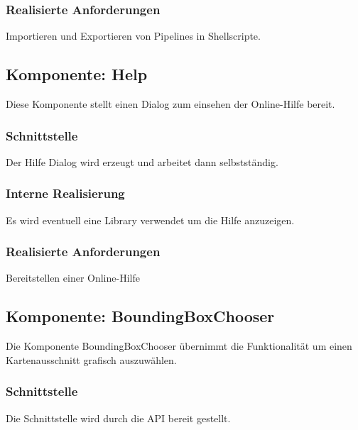 \documentclass[a4paper,12pt]{scrartcl}
\begin{document}
\subsubsection{Realisierte Anforderungen}
Importieren und Exportieren von Pipelines in Shellscripte.

\subsection{Komponente: Help}
Diese Komponente stellt einen Dialog zum einsehen der Online-Hilfe bereit.
\subsubsection{Schnittstelle}
Der Hilfe Dialog wird erzeugt und arbeitet dann selbstständig.
\subsubsection{Interne Realisierung}
Es wird eventuell eine Library verwendet um die Hilfe anzuzeigen.
\subsubsection{Realisierte Anforderungen}
Bereitstellen einer Online-Hilfe
\subsection{Komponente: BoundingBoxChooser}
Die Komponente BoundingBoxChooser übernimmt die Funktionalität um einen Kartenausschnitt grafisch auszuwählen.
\subsubsection{Schnittstelle}
Die Schnittstelle wird durch die API bereit gestellt.
\end{document}

